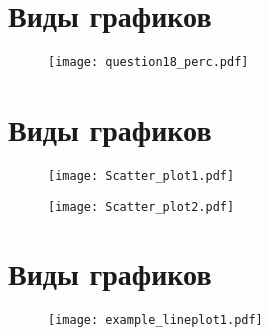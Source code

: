 \documentclass[xcolor=dvipsnames, 12pt]{beamer}
\begin{document}
\section{Виды графиков }

\begin{frame}

\begin{figure}[h!]
\hspace*{-1cm}
 \centering
 \texttt{[image: question18\_perc.pdf]}

\end{figure}

\end{frame}

\section{Виды графиков }

\begin{frame}

\begin{figure}[h!]
\hspace*{-1cm}
 \centering
 \texttt{[image: Scatter\_plot1.pdf]}

\end{figure}

\end{frame}

\begin{frame}

\begin{figure}[h!]
\hspace*{-1cm}
 \centering
 \texttt{[image: Scatter\_plot2.pdf]}

\end{figure}

\end{frame}

\section{Виды графиков }

\begin{frame}

\begin{figure}[h!]
\hspace*{-1cm}
 \centering
 \texttt{[image: example\_lineplot1.pdf]}

\end{figure}

\end{frame}
\end{document}
